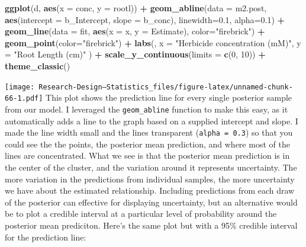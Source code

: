\documentclass[
]{book}
\newenvironment{Shaded}{\begin{snugshade}}{\end{snugshade}}
\newcommand{\AttributeTok}[1]{\textcolor[rgb]{0.13,0.29,0.53}{#1}}
\newcommand{\DecValTok}[1]{\textcolor[rgb]{0.00,0.00,0.81}{#1}}
\newcommand{\FloatTok}[1]{\textcolor[rgb]{0.00,0.00,0.81}{#1}}
\newcommand{\FunctionTok}[1]{\textcolor[rgb]{0.13,0.29,0.53}{\textbf{#1}}}
\newcommand{\NormalTok}[1]{#1}
\newcommand{\SpecialCharTok}[1]{\textcolor[rgb]{0.81,0.36,0.00}{\textbf{#1}}}
\newcommand{\StringTok}[1]{\textcolor[rgb]{0.31,0.60,0.02}{#1}}
\begin{document}
\begin{Shaded}
\begin{Highlighting}[]
\FunctionTok{ggplot}\NormalTok{(d, }\FunctionTok{aes}\NormalTok{(}\AttributeTok{x =}\NormalTok{ conc, }\AttributeTok{y =}\NormalTok{ rootl)) }\SpecialCharTok{+}
  \FunctionTok{geom\_abline}\NormalTok{(}\AttributeTok{data =}\NormalTok{ m2.post, }
              \FunctionTok{aes}\NormalTok{(}\AttributeTok{intercept =}\NormalTok{ b\_Intercept, }\AttributeTok{slope =}\NormalTok{ b\_conc),}
              \AttributeTok{linewidth=}\FloatTok{0.1}\NormalTok{, }\AttributeTok{alpha=}\FloatTok{0.1}\NormalTok{) }\SpecialCharTok{+}
  \FunctionTok{geom\_line}\NormalTok{(}\AttributeTok{data =}\NormalTok{ fit, }\FunctionTok{aes}\NormalTok{(}\AttributeTok{x =}\NormalTok{ x, }\AttributeTok{y =}\NormalTok{ Estimate), }\AttributeTok{color=}\StringTok{"firebrick"}\NormalTok{) }\SpecialCharTok{+}
  \FunctionTok{geom\_point}\NormalTok{(}\AttributeTok{color=}\StringTok{"firebrick"}\NormalTok{) }\SpecialCharTok{+}
  \FunctionTok{labs}\NormalTok{(,}
    \AttributeTok{x =} \StringTok{"Herbicide concentration (mM)"}\NormalTok{,}
    \AttributeTok{y =} \StringTok{"Root Length (cm)"}
\NormalTok{  ) }\SpecialCharTok{+}
  \FunctionTok{scale\_y\_continuous}\NormalTok{(}\AttributeTok{limits =} \FunctionTok{c}\NormalTok{(}\DecValTok{0}\NormalTok{, }\DecValTok{10}\NormalTok{)) }\SpecialCharTok{+} 
  \FunctionTok{theme\_classic}\NormalTok{()}
\end{Highlighting}
\end{Shaded}

\texttt{[image: Research-Design---Statistics\_files/figure-latex/unnamed-chunk-66-1.pdf]}
This plot shows the prediction line for every single posterior sample from our model. I leveraged the \texttt{geom\_abline} function to make this easy, as it automatically adds a line to the graph based on a supplied intercept and slope. I made the line width small and the lines transparent (\texttt{alpha\ =\ 0.3}) so that you could see the the points, the posterior mean prediction, and where most of the lines are concentrated. What we see is that the posterior mean prediction is in the center of the cluster, and the variation around it represents uncertainty. The more variation in the predictions from individual samples, the more uncertainty we have about the estimated relationship. Including predictions from each draw of the posterior can effective for displaying uncertainty, but an alternative would be to plot a credible interval at a particular level of probability around the posterior mean prediciton. Here's the same plot but with a 95\% credible interval for the prediction line:
\end{document}
